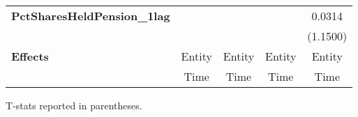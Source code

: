 \begin{center}
\begin{tabular}{lcccc}
    \textbf{PctSharesHeldPension\_1lag}        &                     &                                &                     &              0.0314              \\
    \textbf{ }                                 &                     &                                &                     &             (1.1500)             \\
    \midrule
    \textbf{Effects}                           &        Entity       &             Entity             &        Entity       &              Entity              \\
    & Time & Time & Time & Time\\
    \bottomrule
  \end{tabular}
\end{center}
T-stats reported in parentheses.
